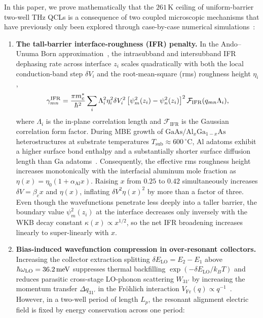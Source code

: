 \documentclass[11pt,letterpaper]{article}
\renewcommand{\hbar}{\mathchar'26\mkern-9mu h}
\begin{document}
In this paper, we prove mathematically that the $261\,\mathrm{K}$ ceiling of uniform-barrier two-well THz QCLs is a consequence of two coupled microscopic mechanisms that have previously only been explored through case-by-case numerical simulations~\cite{JirauschekRoadmap2025,DemicRoadmap2025}:
\begin{enumerate}
    \item \textbf{The tall-barrier interface-roughness (IFR) penalty.} In the Ando--Unuma Born approximation~\cite{Ando1982,Unuma2003,Vurgaftman2021}, the intrasubband and intersubband IFR dephasing rate across interface $z_i$ scales quadratically with both the local conduction-band step $\delta V_i$ and the root-mean-square (rms) roughness height $\eta_i$,
    \begin{equation}
    \gamma_{mn}^{\mathrm{IFR}} = \frac{\pi m_c^*}{\hbar^2}\sum_i \Lambda_i^2 \eta_i^2 \delta V_i^2 \left[\psi_m^2(z_i) - \psi_n^2(z_i)\right]^2 \mathcal{F}_{\mathrm{IFR}}(q_{mn}\Lambda_i),
    \label{eq:intro_ifr}
    \end{equation}
    where $\Lambda_i$ is the in-plane correlation length and $\mathcal{F}_{\mathrm{IFR}}$ is the Gaussian correlation form factor. During MBE growth of $\mathrm{GaAs}/\mathrm{Al}_x\mathrm{Ga}_{1-x}\mathrm{As}$ heterostructures at substrate temperatures $T_{\mathrm{sub}} \approx 600\,^\circ\mathrm{C}$, $\mathrm{Al}$ adatoms exhibit a higher surface bond enthalpy and a substantially shorter surface diffusion length than $\mathrm{Ga}$ adatoms~\cite{Shitara1993,LiLinfieldRoadmap2025}. Consequently, the effective rms roughness height increases monotonically with the interfacial aluminum mole fraction as $\eta(x) = \eta_0(1 + \alpha_{\mathrm{Al}} x)$. Raising $x$ from $0.25$ to $0.42$ simultaneously increases $\delta V = \beta_c x$ and $\eta(x)$, inflating $\delta V^2 \eta(x)^2$ by more than a factor of three. Even though the wavefunctions penetrate less deeply into a taller barrier, the boundary value $\psi_m^2(z_i)$ at the interface decreases only inversely with the WKB decay constant $\kappa(x) \propto x^{1/2}$, so the net IFR broadening increases linearly to super-linearly with $x$.
    \item \textbf{Bias-induced wavefunction compression in over-resonant collectors.} Increasing the collector extraction splitting $\delta E_{\mathrm{LO}} = E_2 - E_1$ above $\hbar\omega_{\mathrm{LO}} = 36.2\,\mathrm{meV}$ suppresses thermal backfilling $\exp(-\delta E_{\mathrm{LO}}/k_B T)$ and reduces parasitic cross-stage LO-phonon scattering $W_{31'}$ by increasing the momentum transfer $\Delta q_{31'}$ in the Fr\"ohlich interaction $V_{\mathrm{Fr}}(q) \propto q^{-1}$~\cite{DemicRoadmap2025}. However, in a two-well period of length $L_p$, the resonant alignment electric field is fixed by energy conservation across one period:

\end{enumerate}
\end{document}
